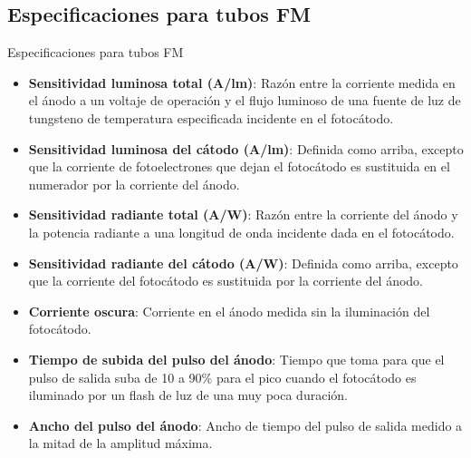 \documentclass[a4paper,10pt]{beamer}
\begin{document}
\subsection{Especificaciones para tubos FM}
\begin{frame}{Especificaciones para tubos FM}

\begin{small}
\begin{itemize}[<+->]
 \item \begin{justify}
        \textbf{Sensitividad luminosa total (A/lm)}: Razón entre la corriente medida en el
        ánodo a un voltaje de operación y el flujo luminoso de una fuente de luz de 
        tungsteno de temperatura especificada incidente en el fotocátodo.
       \end{justify}
 \item \begin{justify}
        \textbf{Sensitividad luminosa del cátodo (A/lm)}: Definida como arriba, 
        excepto que la corriente de fotoelectrones que dejan el fotocátodo 
        es sustituida en el numerador por la corriente del ánodo.
       \end{justify}
 \item \begin{justify}
        \textbf{Sensitividad radiante total (A/W)}: Razón entre la corriente 
        del ánodo y la potencia radiante a una longitud de onda incidente dada 
        en el fotocátodo.
       \end{justify}
 \item \begin{justify}
        \textbf{Sensitividad radiante del cátodo (A/W)}: Definida como arriba, excepto 
        que la corriente del fotocátodo es sustituida por la corriente del ánodo.
       \end{justify}
 \item \begin{justify}
        \textbf{Corriente oscura}: Corriente en el ánodo medida sin la iluminación 
        del fotocátodo. 
       \end{justify}
 \item \begin{justify}
        \textbf{Tiempo de subida del pulso del ánodo}: Tiempo que toma para que el 
        pulso de salida suba de 10 a 90\% para el pico cuando el fotocátodo es 
        iluminado por un flash de luz de una muy poca duración.
       \end{justify}
 \item \begin{justify}
        \textbf{Ancho del pulso del ánodo}: Ancho de tiempo del pulso de salida 
        medido a la mitad de la amplitud máxima.
       \end{justify}
\end{itemize}
\end{small}
 
\end{frame}
\end{document}
